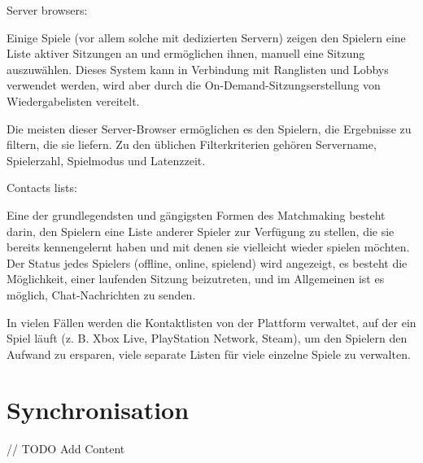 Server browsers:

Einige Spiele (vor allem solche mit dedizierten Servern) zeigen den Spielern eine Liste aktiver Sitzungen an und ermöglichen ihnen, manuell eine Sitzung auszuwählen. Dieses System kann in Verbindung mit Ranglisten und Lobbys verwendet werden, wird aber durch die On-Demand-Sitzungserstellung von Wiedergabelisten vereitelt.

Die meisten dieser Server-Browser ermöglichen es den Spielern, die Ergebnisse zu filtern, die sie liefern. Zu den üblichen Filterkriterien gehören Servername, Spielerzahl, Spielmodus und Latenzzeit. 

Contacts lists:

Eine der grundlegendsten und gängigsten Formen des Matchmaking besteht darin, den Spielern eine Liste anderer Spieler zur Verfügung zu stellen, die sie bereits kennengelernt haben und mit denen sie vielleicht wieder spielen möchten. Der Status jedes Spielers (offline, online, spielend) wird angezeigt, es besteht die Möglichkeit, einer laufenden Sitzung beizutreten, und im Allgemeinen ist es möglich, Chat-Nachrichten zu senden.

In vielen Fällen werden die Kontaktlisten von der Plattform verwaltet, auf der ein Spiel läuft (z. B. Xbox Live, PlayStation Network, Steam), um den Spielern den Aufwand zu ersparen, viele separate Listen für viele einzelne Spiele zu verwalten. 

\cite{Wikipedia.2021b}

\section{Synchronisation}

// TODO Add Content